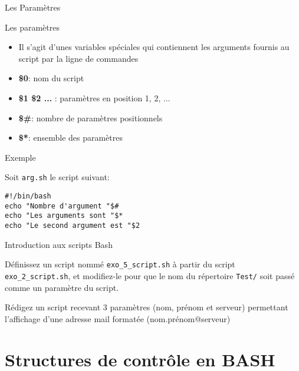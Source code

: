 \begin{frame}[fragile]{Les Paramètres}
\begin{block}{Les paramètres}
\begin{itemize}
\item Il s'agit d'unes variables spéciales qui contiennent les arguments fournis au script par la ligne de commandes
\item \textbf{\$0}: nom du script
\item \textbf{\$1 \$2 ... }: paramètres en position 1, 2, ...
\item \textbf{\$\#}: nombre de paramètres positionnels
\item \textbf{\$*}: ensemble des paramètres
\end{itemize}
\end{block}

\begin{block}{Exemple}
\small{
Soit \texttt{arg.sh} le script suivant:
\begin{verbatim}
#!/bin/bash
echo "Nombre d'argument "$#
echo "Les arguments sont "$*
echo "Le second argument est "$2
\end{verbatim}
\vspace{0.1cm}
}
\end{block}
  
\end{frame}

\begin{exercice}
  \begin{exercicelet}{Introduction aux scripts Bash}
    \begin{questions}
    \item Définissez un script nommé \texttt{exo\_5\_script.sh} à partir du script \texttt{exo\_2\_script.sh}, et modifiez-le pour que le nom du répertoire \texttt{Test/} soit passé comme un paramètre du script.
	\item Rédigez un script recevant 3 paramètres (nom, prénom et serveur) permettant l'affichage d'une adresse mail formatée (nom.prénom@serveur)

    \end{questions}
  \end{exercicelet}
\end{exercice}

\section{Structures de contrôle en BASH}
